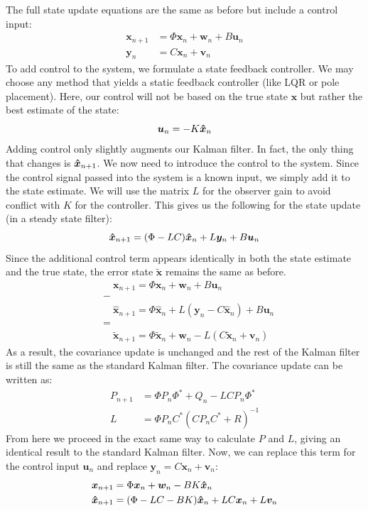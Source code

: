 The full state update equations are the same as before but include a control input:
\begin{align}
\bm{{x}}_{n+1}&=\Phi\bm{x}_n+\bm{w}_n+B\bm{u}_n\\
\bm{y}_n&=C\bm{x}_n+\bm{v}_n
\end{align}
To add control to the system, we formulate a state feedback controller. We may choose any method that yields a static feedback controller (like LQR or pole placement). Here, our control will not be based on the true state $\bm{x}$ but rather the best estimate of the state:
$$\bm{u}_n=-K\bm{\hat{x}}_n$$
Adding control only slightly augments our Kalman filter. In fact, the only thing that changes is $\bm{\hat{x}}_{n+1}$. We now need to introduce the control to the system. Since the control signal passed into the system is a known input, we simply add it to the state estimate. We will use the matrix $L$ for the observer gain to avoid conflict with $K$ for the controller. This gives us the following for the state update (in a steady state filter):
$$\bm{\hat{x}}_{n+1}=(\Phi-LC)\bm{\hat{x}}_n+L\bm{y}_n+B\bm{u}_n$$
Since the additional control term appears identically in both the state estimate and the true state, the error state $\bm{\tilde{x}}$ remains the same as before. 
\begin{align}
&\quad\bm{{x}}_{n+1}=\Phi\bm{{x}}_{n}+\bm{w}_n+B\bm{u}_n
\\&-
\\&\quad\bm{\hat{x}}_{n+1}=\Phi \bm{\hat{x}}_{n}+ L(\bm{y}_n-C\bm{\hat{x}}_n)+B\bm{u}_n\\
&=\\
&\quad\bm{\tilde{x}}_{n+1}=\Phi\bm{\tilde{x}}_{n}+\bm{w}_n-L(C\bm{\tilde{x}}_{n}+\bm{v}_n)
\end{align}
As a result, the covariance update is unchanged and the rest of the Kalman filter is still the same as the standard Kalman filter. The covariance update can be written as:
\begin{align}
P_{n+1}&=\Phi P_n\Phi^*+Q_n- LCP_n\Phi^*
    \\
    L&=\Phi P_nC^*(CP_nC^*+R)^{-1}
\end{align}
From here we proceed in the exact same way to calculate $P$ and $L$, giving an identical result to the standard Kalman filter. Now, we can replace this term for the control input $\bm{u}_n$ and replace $\bm{y}_n=C\bm{x}_n+\bm{v}_n$:
\begin{align}
\bm{{x}}_{n+1}&=\Phi\bm{{x}}_{n}+\bm{w}_n-BK\bm{\hat{x}}_n\\
\bm{\hat{x}}_{n+1}&=(\Phi-LC-BK)\bm{\hat{x}}_n+LC\bm{x}_n+L\bm{v}_n
\end{align}
